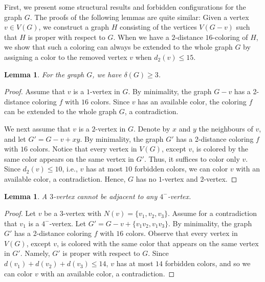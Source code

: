 \documentclass[12pt, reqno]{amsart}
\theoremstyle{plain}
\newtheorem{lemma}[equation]{Lemma}
\theoremstyle{definition}
\numberwithin{equation}{section}
\begin{document}


First, we present some structural results and forbidden configurations for the graph $G$. The proofs of the following lemmas are quite similar: Given a vertex $v\in V(G)$, we construct a graph $H$ consisting of the vertices $V(G-v)$ such that $H$ is proper with respect to $G$. When we have a $2$-distance $16$-coloring of $H$, we show that such a coloring can always be extended to the whole graph $G$ by assigning a color to the removed vertex $v$ when $d_2(v)\leq 15$.






\begin{lemma}\label{lem:deg-geq-3}
For the graph $G$, we have $\delta(G)\geq 3$. 
\end{lemma}
\begin{proof}
Assume that $v$ is a $1$-vertex in $G$. By minimality, the graph $G-v$ has a 2-distance coloring $f$ with $16$ colors. Since $v$ has an available color, the coloring $f$ can be extended to the whole graph $G$, a contradiction. 


We next assume that $v$ is a $2$-vertex in $G$. Denote by $x$ and $y$ the neighbours of $v$, and let $G'=G-v+xy$. By minimality, the graph $G'$ has a 2-distance coloring $f$ with $16$ colors. Notice that every vertex in $V(G)$, except $v$, is colored by the same color appears on the same vertex in $G'$. Thus, it suffices to color only $v$. Since $d_2(v)\leq 10$, i.e., $v$ has at most $10$ forbidden colors, we can color $v$ with an available color, a contradiction. Hence, $G$ has no $1$-vertex and $2$-vertex.
\end{proof}

\begin{lemma}\label{lem:3-vertex-no-3-4-neighbour}
A $3$-vertex cannot be adjacent to any $4^-$-vertex. 
\end{lemma}
\begin{proof}
Let $v$ be a $3$-vertex with $N(v)=\{v_1,v_2,v_3\}$. Assume for a contradiction that $v_1$ is a $4^-$-vertex. Let $G'=G-v+\{v_1v_2,v_1v_3\}$. By minimality, the graph $G'$ has a 2-distance coloring $f$ with $16$ colors. Observe that every vertex in $V(G)$, except $v$, is colored with the same color that appears on the same vertex in $G'$. Namely, $G'$ is proper with respect to $G$. Since $d(v_1)+d(v_2)+d(v_3)\leq 14$,   $v$ has at most $14$ forbidden colors, and so we can color $v$ with an available color, a contradiction.
\end{proof}
\end{document}
